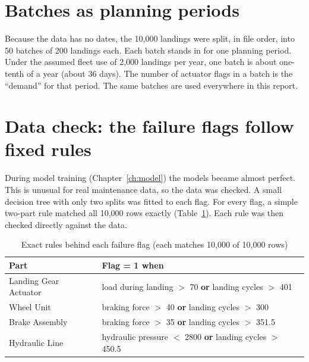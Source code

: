 \documentclass[12pt,oneside]{report}
\newcommand{\gl}[2]{\phantomsection\label{gl:#1}#2}
\begin{document}
\section{Batches as planning periods}
Because the data has no dates, the 10,000 landings were split, in file order, into 50 \gl{batch}{batches} of 200 landings each. Each batch stands in for one planning period. Under the assumed fleet use of 2,000 landings per year, one batch is about one-tenth of a year (about 36 days). The number of actuator flags in a batch is the ``demand'' for that period. The same batches are used everywhere in this report.

\section{Data check: the failure flags follow fixed rules}
\label{sec:rules}
During model training (Chapter~\ref{ch:model}) the models became almost perfect. This is unusual for real maintenance data, so the data was checked. A small decision tree with only two splits was fitted to each flag. For every flag, a simple two-part rule matched all 10,000 rows exactly (Table~\ref{tab:rules}). Each rule was then checked directly against the data.

\begin{table}[htbp]
\centering\small
\caption[Rules behind each failure flag]{Exact rules behind each failure flag (each matches 10,000 of 10,000 rows)}
\label{tab:rules}
\begin{tabular}{@{}ll@{}}
\toprule
\textbf{Part} & \textbf{Flag = 1 when}\\
\midrule
Landing Gear Actuator & load during landing $>$ 70 \textbf{or} landing cycles $>$ 401\\
Wheel Unit & braking force $>$ 40 \textbf{or} landing cycles $>$ 300\\
Brake Assembly & braking force $>$ 35 \textbf{or} landing cycles $>$ 351.5\\
Hydraulic Line & hydraulic pressure $<$ 2800 \textbf{or} landing cycles $>$ 450.5\\
\bottomrule
\end{tabular}
\end{table}
\end{document}
